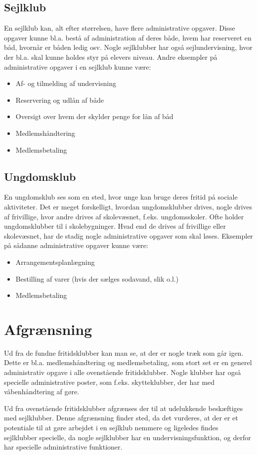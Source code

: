 \subsection{Sejlklub}

En sejlklub kan, alt efter størrelsen, have flere administrative opgaver. Disse opgaver kunne bl.a. bestå af
administration af deres både, hvem har reserveret en båd, hvornår er båden ledig osv. Nogle sejlklubber har også
sejlundervisning, hvor der bl.a. skal kunne holdes styr på elevers niveau. Andre eksempler på administrative opgaver i
en sejlklub kunne være:

\begin{itemize}
\item Af- og tilmelding af undervisning
\item Reservering og udlån af både
\item Oversigt over hvem der skylder penge for lån af båd
\item Medlemshåndtering
\item Medlemsbetaling
\end{itemize}

\subsection{Ungdomsklub}

En ungdomsklub ses som en sted, hvor unge kan bruge deres fritid på sociale aktiviteter. Det er meget forskelligt,
hvordan ungdomsklubber drives, nogle drives af frivillige, hvor andre drives af skolevæsnet, f.eks. ungdomsskoler. Ofte
holder ungdomsklubber til i skolebygninger. Hvad end de drives af frivillige eller skolevæsnet, har de stadig nogle
administrative opgaver som skal løses. Eksempler på sådanne administrative opgaver kunne være:

\begin{itemize}
\item Arrangementsplanlægning
\item Bestilling af varer (hvis der sælges sodavand, slik o.l.)
\item Medlemsbetaling
\end{itemize}

\section{Afgrænsning}

Ud fra de fundne fritidsklubber kan man se, at der er nogle træk som går igen. Dette er bl.a. medlemshåndtering og
medlemsbetaling, som stort set er en generel administrativ opgave i alle ovenstående fritidsklubber. Nogle klubber har
også specielle administrative poster, som f.eks. skytteklubber, der har med våbenhåndtering af gøre.

Ud fra ovenstående fritidsklubber afgrænses der til at udelukkende beskæftiges med sejlklubber. Denne afgrænsning finder
sted, da det vurderes, at der er et potentiale til at gøre arbejdet i en sejlklub nemmere og ligeledes findes
sejlklubber specielle, da nogle sejlklubber har en undervisningsfunktion, og derfor har specielle administrative
funktioner.

